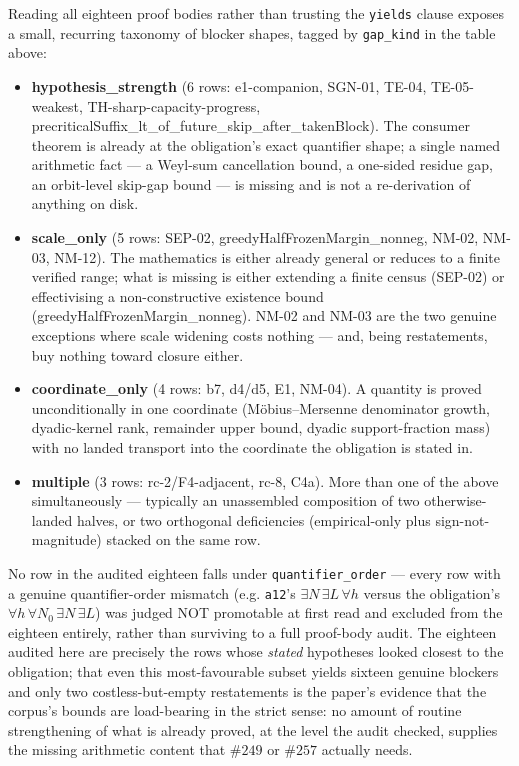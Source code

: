\documentclass[11pt]{article}
\theoremstyle{plain}
\theoremstyle{definition}
\theoremstyle{remark}
\begin{document}
Reading all eighteen proof bodies rather than trusting the \texttt{yields}
clause exposes a small, recurring taxonomy of blocker shapes, tagged by
\texttt{gap\_kind} in the table above:

\begin{itemize}[nosep]
\item \textbf{hypothesis\_strength} (6 rows: e1-companion, SGN-01, TE-04,
TE-05-weakest, TH-sharp-capacity-progress,
precriticalSuffix\_lt\_of\_future\_skip\_after\_takenBlock). The consumer
theorem is already at the obligation's exact quantifier shape; a single
named arithmetic fact — a Weyl-sum cancellation bound, a one-sided residue
gap, an orbit-level skip-gap bound — is missing and is not a re-derivation
of anything on disk.
\item \textbf{scale\_only} (5 rows: SEP-02, greedyHalfFrozenMargin\_nonneg,
NM-02, NM-03, NM-12). The mathematics is either already general or reduces
to a finite verified range; what is missing is either extending a finite
census (SEP-02) or effectivising a non-constructive existence bound
(greedyHalfFrozenMargin\_nonneg). NM-02 and NM-03 are the two genuine
exceptions where scale widening costs nothing — and, being restatements, buy
nothing toward closure either.
\item \textbf{coordinate\_only} (4 rows: b7, d4/d5, E1, NM-04). A quantity
is proved unconditionally in one coordinate (Möbius--Mersenne denominator
growth, dyadic-kernel rank, remainder upper bound, dyadic support-fraction
mass) with no landed transport into the coordinate the obligation is stated
in.
\item \textbf{multiple} (3 rows: rc-2/F4-adjacent, rc-8, C4a). More than
one of the above simultaneously — typically an unassembled composition of
two otherwise-landed halves, or two orthogonal deficiencies (empirical-only
plus sign-not-magnitude) stacked on the same row.
\end{itemize}

No row in the audited eighteen falls under \texttt{quantifier\_order} — every
row with a genuine quantifier-order mismatch (e.g. \texttt{a12}'s
\(\exists N\,\exists L\,\forall h\) versus the obligation's
\(\forall h\,\forall N_0\,\exists N\,\exists L\)) was judged NOT promotable
at first read and excluded from the eighteen entirely, rather than surviving
to a full proof-body audit. The eighteen audited here are precisely the rows
whose \emph{stated} hypotheses looked closest to the obligation; that even
this most-favourable subset yields sixteen genuine blockers and only two
costless-but-empty restatements is the paper's evidence that the corpus's
bounds are load-bearing in the strict sense: no amount of routine
strengthening of what is already proved, at the level the audit checked,
supplies the missing arithmetic content that \(\#249\) or \(\#257\)
actually needs.
\end{document}
